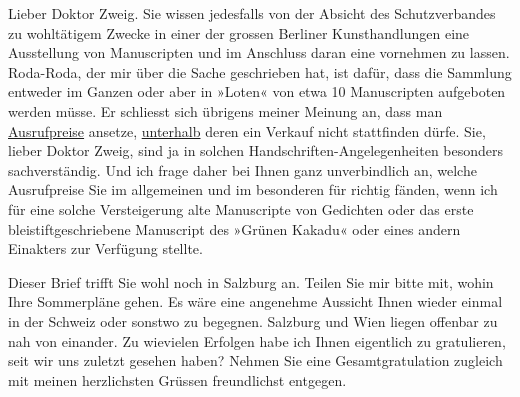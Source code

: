 \pstart{}Lieber Doktor Zweig.\pend\vspace{0.5em}
\pstart
           Sie wissen jedesfalls von der Absicht des Schutzverbandes zu wohltätigem Zwecke in einer der grossen Berliner Kunsthandlungen eine Ausstellung von Manuscripten und
               im Anschluss daran eine \label{K_L03743-1v}\label{K_L03743-1} vornehmen zu lassen. Roda-Roda, der mir über die Sache geschrieben hat, ist dafür, dass die
               Sammlung entweder im Ganzen oder aber in »Loten« von etwa 10 Manuscripten aufgeboten
               werden müsse. Er schliesst sich übrigens meiner Meinung an, dass man \uline{Ausrufpreise} ansetze, \uline{unterhalb} deren ein Verkauf nicht stattfinden dürfe. Sie, lieber Doktor
               Zweig, sind ja in solchen Handschriften-Angelegenheiten besonders sachverständig. Und
               ich frage daher bei Ihnen ganz unverbindlich an, welche Ausrufpreise Sie im
               allgemeinen und im besonderen für richtig fänden, wenn ich \label{K_L03743-2v}\label{K_L03743-2} für eine solche Versteigerung alte Manuscripte von Gedichten oder
                   das erste bleistiftgeschriebene
               Manuscript des »Grünen Kakadu« oder eines \introOben{}andern\introOben{} Einakters zur Verfügung stellte.\pend
           
\pstart
           Dieser Brief trifft Sie wohl noch in Salzburg an.
               Teilen Sie mir bitte mit, wohin Ihre Sommerpläne gehen. Es wäre eine angenehme
               Aussicht Ihnen wieder einmal in der Schweiz
               oder sonstwo zu begegnen. Salzburg und Wien liegen offenbar zu nah von einander. Zu
               wievielen Erfolgen habe ich Ihnen eigentlich zu gratulieren, seit wir uns zuletzt
               gesehen haben? Nehmen Sie eine Gesamtgratulation zugleich mit meinen herzlichsten
               Grüssen freundlichst entgegen.\pend
           
